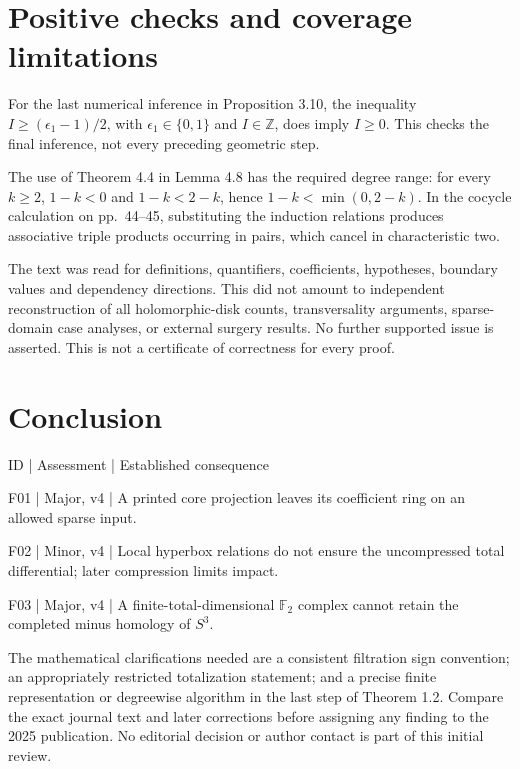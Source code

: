 \documentclass[10pt]{article}
\begin{document}
\section*{Positive checks and coverage limitations}
For the last numerical inference in Proposition 3.10, the inequality \(I\geq(\epsilon_1-1)/2\), with \(\epsilon_1\in\{0,1\}\) and \(I\in\mathbb Z\), does imply \(I\geq0\). This checks the final inference, not every preceding geometric step.\par
The use of Theorem 4.4 in Lemma 4.8 has the required degree range: for every \(k\geq2\), \(1-k<0\) and \(1-k<2-k\), hence \(1-k<\min(0,2-k)\). In the cocycle calculation on pp. 44–45, substituting the induction relations produces associative triple products occurring in pairs, which cancel in characteristic two.\par
The text was read for definitions, quantifiers, coefficients, hypotheses, boundary values and dependency directions. This did not amount to independent reconstruction of all holomorphic-disk counts, transversality arguments, sparse-domain case analyses, or external surgery results. No further supported issue is asserted. This is not a certificate of correctness for every proof.\par
\section*{Conclusion}
ID | Assessment | Established consequence\par
F01 | Major, v4 | A printed core projection leaves its coefficient ring on an allowed sparse input.\par
F02 | Minor, v4 | Local hyperbox relations do not ensure the uncompressed total differential; later compression limits impact.\par
F03 | Major, v4 | A finite-total-dimensional \(\mathbb F_2\) complex cannot retain the completed minus homology of \(S^3\).\par
The mathematical clarifications needed are a consistent filtration sign convention; an appropriately restricted totalization statement; and a precise finite representation or degreewise algorithm in the last step of Theorem 1.2. Compare the exact journal text and later corrections before assigning any finding to the 2025 publication. No editorial decision or author contact is part of this initial review.\par
\end{document}
